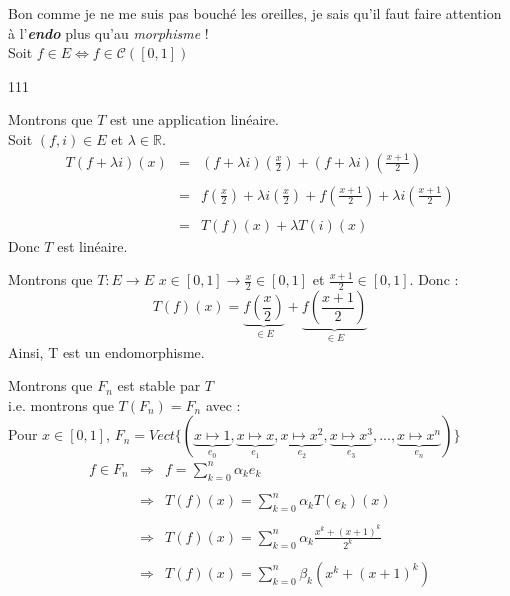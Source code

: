 Bon comme je ne me suis pas bouché les oreilles, je sais qu'il faut faire attention à l'\textit{\textbf{endo}} plus qu'au \textit{morphisme} !\\

Soit $f\in E \iff f\in\mathcal{C}([0, 1])$
\begin{dinglist}{111}
  \item Montrons que $T$ est une application linéaire.\\
  Soit $(f, i) \in E$ et $\lambda \in \mathbb{R}$.
  \[
    \begin{array}{rcl}
      T(f+\lambda i)(x) & = & (f+\lambda i)\left(\frac{x}{2}\right) + (f+\lambda i)\left(\frac{x+1}{2}\right)                                                   \\\\
                        & = & f \left(\frac{x}{2}\right) + \lambda i \left(\frac{x}{2}\right) + f\left(\frac{x+1}{2}\right)+\lambda i\left(\frac{x+1}{2}\right) \\\\
                        & = & T(f)(x) + \lambda T(i)(x)
    \end{array}
  \]
  Donc $T$ est linéaire.
  \item Montrons que $T : E\rightarrow E$
  $x\in [0, 1] \rightarrow \frac{x}{2}\in [0, 1]$ et $\frac{x+1}{2}\in [0, 1]$. Donc :
  \[
    T(f)(x) = \underbrace{f\left(\frac{x}{2}\right)}_{\in E} + \underbrace{f\left(\frac{x+1}{2}\right)}_{\in E}
  \]
  Ainsi, T est un endomorphisme.
  \item Montrons que $F_n$ est stable par $T$
  \\i.e. montrons que $T(F_n) = F_n$ avec :\\
  Pour $x\in [0, 1]$, $F_n = Vect\{(\underbrace{x\mapsto 1}_{e_0}, \underbrace{x\mapsto x}_{e_1}, \underbrace{x\mapsto x^2}_{e_2}, \underbrace{x\mapsto x^3}_{e_3}, ..., \underbrace{x\mapsto x^n}_{e_n})\}$\\
  \[
    \begin{array}{rcl}
      f\in F_n & \Rightarrow & f = \sum\limits_{k=0}^{n}\alpha_k e_k                              \\ \\
               & \Rightarrow & T(f)(x) = \sum\limits_{k=0}^{n}\alpha_k T(e_k)(x)                  \\ \\
               & \Rightarrow & T(f)(x) = \sum\limits_{k=0}^{n}\alpha_k \frac{x^k + (x+1)^k }{2^k} \\ \\
               & \Rightarrow & T(f)(x) = \sum\limits_{k=0}^{n}\beta_k \left(x^k + (x+1)^k\right)  \\ \\
    \end{array}
  \]
\end{dinglist}

